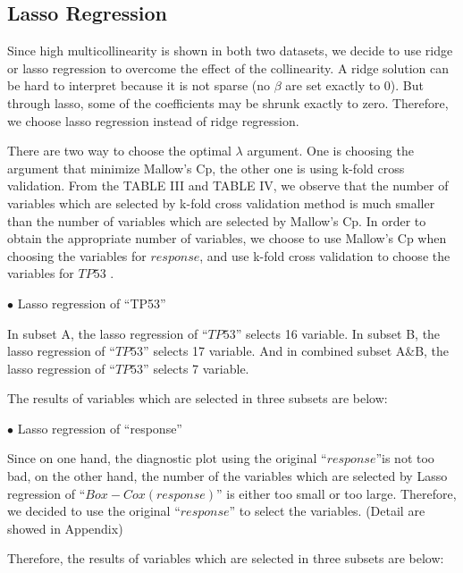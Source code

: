 \documentclass[conference,letterpaper]{IEEEtran}
\begin{document}
\subsection{{\fontsize{11}{13}\selectfont Lasso Regression}}
{\fontsize{11}{13}\selectfont Since high multicollinearity is shown in both two datasets, we decide to use ridge or lasso regression to overcome the effect of the collinearity. A ridge solution can be hard to interpret because it is not sparse (no $\beta$ are set exactly to 0). But through lasso, some of the coefficients may be shrunk exactly to zero. Therefore, we choose lasso regression instead of ridge regression.

There are two way to choose the optimal $\lambda$ argument. One is choosing the argument that minimize Mallow's Cp, the other one is using k-fold cross validation. From the TABLE III and TABLE IV, we observe that the number of variables which are selected by k-fold cross validation method is much smaller than the number of variables which are selected by Mallow's Cp. In order to obtain the appropriate number of variables,  we choose to use Mallow's Cp when choosing the variables for $response$, and use k-fold cross validation to choose the variables for $TP53$ .


$\bullet$ {\fontsize{11}{13}\selectfont Lasso regression of ``TP53''}

In subset A, the lasso regression of ``$TP53$'' selects 16 variable. In subset B, the lasso regression of ``$TP53$''  selects 17 variable. And in combined subset A\&B, the lasso regression of ``$TP53$''  selects 7 variable. 

The results of variables which are selected in three subsets are below:}


{\fontsize{11}{13}\selectfont
$\bullet$ {\fontsize{11}{13}\selectfont Lasso regression of ``response''}

Since on one hand, the diagnostic plot using the original ``$response$''is not too bad, on the other hand, the number of the variables which are selected by Lasso regression of ``$Box-Cox(response)$'' is either too small or too large. Therefore, we decided to use the original ``$response$'' to select the variables. (Detail are showed in Appendix) 

Therefore, the results of variables which are selected in three subsets are below:}
\end{document}

